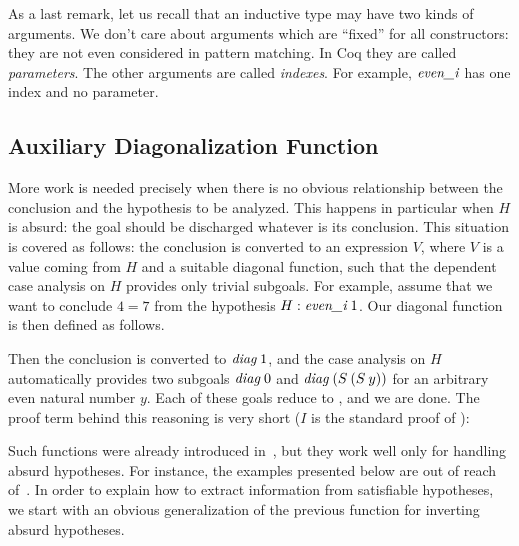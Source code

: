 As a last remark, let us recall that
an inductive type may have two kinds of arguments.
We don't care about arguments which are ``fixed'' for all constructors:
they are not even considered in pattern matching.
In Coq they are called \emph{parameters}.
The other arguments are called \emph{indexes}.
For example, $\textit{even\_i}$ has one index and no parameter.

\subsection{Auxiliary Diagonalization Function}
\label{sec:absurd}

More work is needed precisely when there is no obvious relationship
between the conclusion and the hypothesis to be analyzed.
This happens in particular when $H$ is absurd:
the goal should be discharged whatever is its conclusion.
This situation is covered as follows:
the conclusion is converted 
to an expression \diag $V$,
where $V$ is a value coming from $H$ 
and \diag a suitable diagonal function, such that
the dependent case analysis on $H$ provides only trivial subgoals.
For example, assume that we want to conclude
$4=7$ from the hypothesis $H: \textit{even\_i}\;1$.
Our diagonal function is then defined as follows.

\medskip
{}

\noindent
Then the conclusion is converted to $\textit{diag}\;1$,
and the case analysis on $H$ 
automatically provides two subgoals $\textit{diag}\;0$
and $\textit{diag}\;(S\: (S\:y))$ for an arbitrary even natural number $y$.
Each of these goals reduce to \True, 
and we are done.
The proof term behind this reasoning is very short
($I$ is the standard proof of \True):

\medskip
{}

Such functions were already introduced in~\cite{small_inv},
but they work well only for handling absurd hypotheses.
For instance, the examples presented below are out of reach
of~\cite{small_inv}.
In order to explain how to extract information from satisfiable hypotheses,
we start with an obvious generalization of the previous function
for inverting absurd hypotheses.



